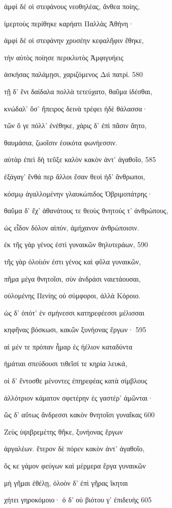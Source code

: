 ἀμφὶ δέ οἱ στεφάνους νεοθηλέας, ἄνθεα ποίης,

ἱμερτοὺς περίθηκε καρήατι Παλλὰς Ἀθήνη· 

ἀμφὶ δέ οἱ στεφάνην χρυσέην κεφαλῆφιν ἔθηκε,

τὴν αὐτὸς ποίησε περικλυτὸς Ἀμφιγυήεις

ἀσκήσας παλάμῃσι, χαριζόμενος Διὶ πατρί. \num{580}

τῇ δ' ἔνι δαίδαλα πολλὰ τετεύχατο, θαῦμα ἰδέσθαι,

κνώδαλ' ὅσ' ἤπειρος δεινὰ τρέφει ἠδὲ θάλασσα·

τῶν ὅ γε πόλλ' ἐνέθηκε, χάρις δ' ἐπὶ πᾶσιν ἄητο,

θαυμάσια, ζωοῖσιν ἐοικότα φωνήεσσιν.

αὐτὰρ ἐπεὶ δὴ τεῦξε καλὸν κακὸν ἀντ' ἀγαθοῖο, \num{585} 

ἐξάγαγ' ἔνθά περ ἄλλοι ἔσαν θεοὶ ἠδ' ἄνθρωποι,

κόσμῳ ἀγαλλομένην γλαυκώπιδος Ὀβριμοπάτρης· 

θαῦμα δ' ἔχ' ἀθανάτους τε θεοὺς θνητούς τ' ἀνθρώπους,

ὡς εἶδον δόλον αἰπύν, ἀμήχανον ἀνθρώποισιν.

ἐκ τῆς γὰρ γένος ἐστὶ γυναικῶν θηλυτεράων, \num{590}

τῆς γὰρ ὀλοίιόν ἐστι γένος καὶ φῦλα γυναικῶν,

πῆμα μέγα θνητοῖσι, σὺν ἀνδράσι ναιετάουσαι,

οὐλομένης Πενίης οὐ σύμφοροι, ἀλλὰ Κόροιο.

ὡς δ' ὁπότ' ἐν σμήνεσσι κατηρεφέεσσι μέλισσαι

κηφῆνας βόσκωσι, κακῶν ξυνήονας ἔργων· \num{595}

αἱ μέν τε πρόπαν ἦμαρ ἐς ἠέλιον καταδύντα

ἠμάτιαι σπεύδουσι τιθεῖσί τε κηρία λευκά,

οἱ δ' ἔντοσθε μένοντες ἐπηρεφέας κατὰ σίμβλους 

ἀλλότριον κάματον σφετέρην ἐς γαστέρ' ἀμῶνται· 

ὣς δ' αὔτως ἄνδρεσσι κακὸν θνητοῖσι γυναῖκας \num{600}

Ζεὺς ὑψιβρεμέτης θῆκε, ξυνήονας ἔργων

ἀργαλέων. ἕτερον δὲ πόρεν κακὸν ἀντ' ἀγαθοῖο,

ὅς κε γάμον φεύγων καὶ μέρμερα ἔργα γυναικῶν

μὴ γῆμαι ἐθέλῃ, ὀλοὸν δ' ἐπὶ γῆρας ἵκηται

χήτει γηροκόμοιο· ὁ δ' οὐ βιότου γ' ἐπιδευὴς \num{605} 

